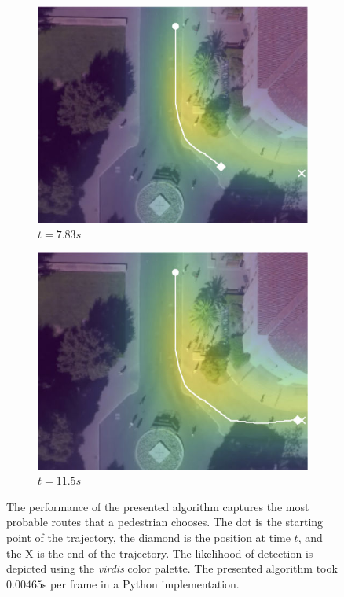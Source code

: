 \documentclass[letterpaper,10pt,conference]{ieeetran}
\begin{document}
\begin{figure}
	\begin{subfigure}[b]{.45\linewidth}
		\includegraphics[width=\linewidth]{./figures/FirstPage/gates_1_2_t=235.jpg}
		\caption{$t=7.83s$}
	\end{subfigure}
	\begin{subfigure}[b]{.45\linewidth}
		\includegraphics[width=\linewidth]{./figures/FirstPage/gates_1_2_t=345.jpg}
		\caption{$t=11.5s$}
	\end{subfigure}
	\caption{The performance of the presented algorithm captures the most probable routes that a pedestrian chooses. The dot is the starting point of the trajectory, the diamond is the position at time $t$, and the X is the end of the trajectory. The likelihood of detection is depicted using the \textit{virdis} color palette. The presented algorithm took $0.00465$s per frame in a Python implementation. }
	\label{fig:gates-1-2}
	\vspace*{-0.7cm}
\end{figure}
\end{document}
